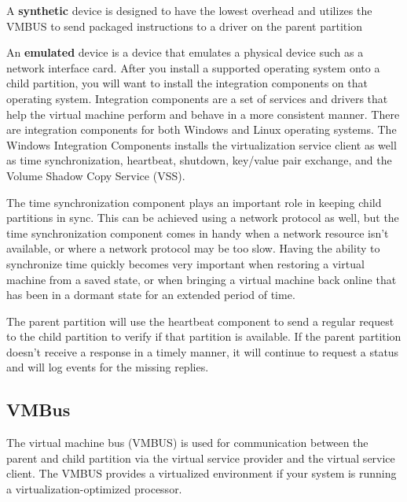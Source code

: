 A \textbf{synthetic} device is designed to have the lowest overhead and utilizes the VMBUS to send packaged instructions to a driver on the parent partition

\vspace{5mm}

An \textbf{emulated} device is a device that emulates a physical device such as a network interface card. After you install a supported operating system onto a child partition, 
you will want to install the integration components on that operating system. Integration components are a set of services and drivers that help the virtual machine perform and behave 
in a more consistent manner. There are integration components for both Windows and Linux operating systems. The Windows Integration Components installs the virtualization service client 
as well as time synchronization, heartbeat, shutdown, key/value pair exchange, and the Volume Shadow Copy Service (VSS).

\vspace{5mm}

The time synchronization component plays an important role in keeping child partitions in sync. This can be achieved using a network protocol as well, but the time synchronization component comes in handy when a network resource isn’t available, or where a network protocol may be too slow. Having the ability to synchronize time quickly becomes
very important when restoring a virtual machine from a saved state, or when bringing a virtual machine back online that has been in a dormant state for an extended period of time.

\vspace{5mm}

The parent partition will use the heartbeat component to send a regular request to the child partition to verify if that partition is available. If the parent partition doesn’t
receive a response in a timely manner, it will continue to request a status and will log
events for the missing replies.

\subsection{VMBus}

\vspace{5mm}

The virtual machine bus (VMBUS) \cite{BOOK:2} is used for communication between the parent and child partition via the virtual service provider and the virtual service client. The VMBUS
provides a virtualized environment if your system is running a virtualization-optimized processor.

